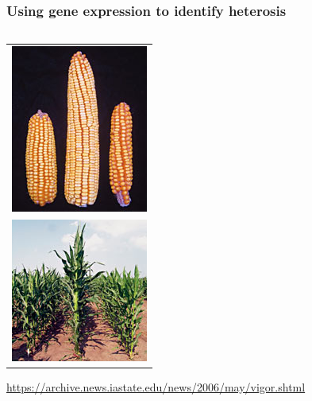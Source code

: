 \documentclass{beamer}
\begin{document}
\begin{frame}%
  \frametitle{Using gene expression to identify heterosis}
  \begin{columns}
    \begin{column}{.3\textwidth}
      \begin{table}
        \begin{tabular}{c}
          \includegraphics[height=.35\textheight]{BFMears}\\
          \includegraphics[height=.35\textheight]{BFMfield}
        \end{tabular}
        {\scriptsize \url{https://archive.news.iastate.edu/news/2006/may/vigor.shtml}}
      \end{table}
    \end{column}
    

\end{columns}
\end{frame}
\end{document}
